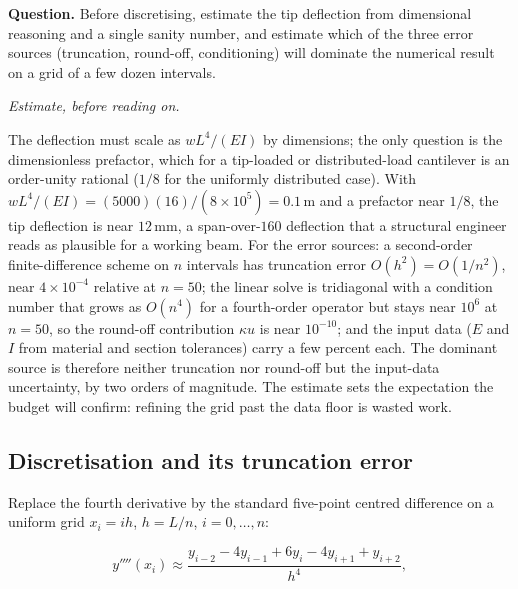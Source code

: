 \begin{estimation}
\textbf{Question.} Before discretising, estimate the tip deflection from
dimensional reasoning and a single sanity number, and estimate which of the
three error sources (truncation, round-off, conditioning) will dominate the
numerical result on a grid of a few dozen intervals.

\smallskip
\textit{Estimate, before reading on.}

\smallskip
The deflection must scale as $w L^{4}/(E I)$ by dimensions; the only
question is the dimensionless prefactor, which for a tip-loaded or
distributed-load cantilever is an order-unity rational ($1/8$ for the
uniformly distributed case). With $w L^{4}/(E I) = (5000)(16)/(8 \times
10^{5}) = 0.1\,\text{m}$ and a prefactor near $1/8$, the tip deflection is
near $12\,\text{mm}$, a span-over-$160$ deflection that a structural
engineer reads as plausible for a working beam. For the error sources: a
second-order finite-difference scheme on $n$ intervals has truncation error
$O(h^{2}) = O(1/n^{2})$, near $4 \times 10^{-4}$ relative at $n = 50$; the
linear solve is tridiagonal with a condition number that grows as
$O(n^{4})$ for a fourth-order operator but stays near $10^{6}$ at $n = 50$,
so the round-off contribution $\kappa u$ is near $10^{-10}$; and the input
data ($E$ and $I$ from material and section tolerances) carry a few percent
each. The dominant source is therefore neither truncation nor round-off
but the input-data uncertainty, by two orders of magnitude. The estimate
sets the expectation the budget will confirm: refining the grid past the
data floor is wasted work.
\end{estimation}

\subsection{Discretisation and its truncation error}

Replace the fourth derivative by the standard five-point centred
difference on a uniform grid $x_{i} = i h$, $h = L/n$, $i = 0, \ldots, n$:

\[
y''''(x_{i}) \approx \frac{y_{i-2} - 4 y_{i-1} + 6 y_{i} - 4 y_{i+1}
+ y_{i+2}}{h^{4}},
\]

